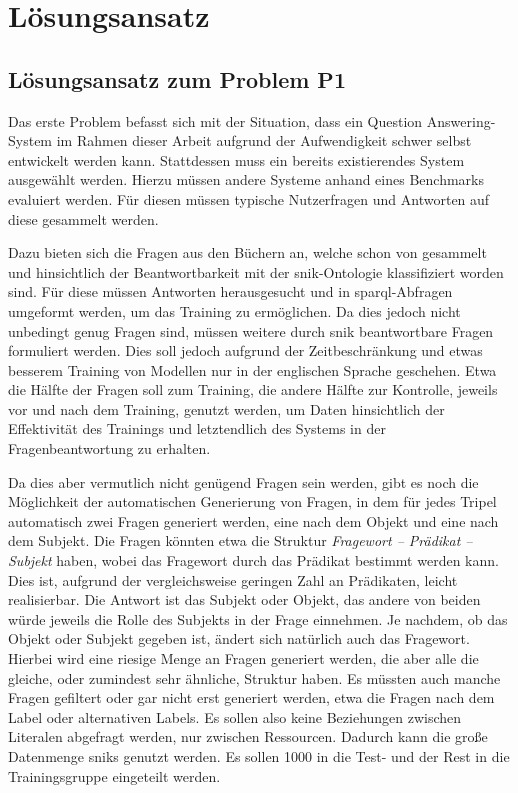 \chapter{Lösungsansatz}\label{ch:approach}

\section{Lösungsansatz zum Problem P1}

Das erste Problem befasst sich mit der Situation, dass ein Question Answering-System im Rahmen dieser Arbeit aufgrund der Aufwendigkeit schwer selbst entwickelt werden kann.
Stattdessen muss ein bereits existierendes System ausgewählt werden.
Hierzu müssen andere Systeme anhand eines Benchmarks evaluiert werden.
Für diesen müssen typische Nutzerfragen und Antworten auf diese gesammelt werden.

Dazu bieten sich die Fragen aus den Büchern an, welche schon von \citet{arneba} gesammelt und hinsichtlich der Beantwortbarkeit mit der \ac{snik}-Ontologie klassifiziert worden sind.
Für diese müssen Antworten herausgesucht und in \ac{sparql}-Abfragen umgeformt werden, um das Training zu ermöglichen.
Da dies jedoch nicht unbedingt genug Fragen sind, müssen weitere durch \ac{snik} beantwortbare Fragen formuliert werden.
Dies soll jedoch aufgrund der Zeitbeschränkung und etwas besserem Training von Modellen nur in der englischen Sprache geschehen.
Etwa die Hälfte der Fragen soll zum Training, die andere Hälfte zur Kontrolle, jeweils vor und nach dem Training, genutzt werden,
um Daten hinsichtlich der Effektivität des Trainings und letztendlich des Systems in der Fragenbeantwortung zu erhalten.

Da dies aber vermutlich nicht genügend Fragen sein werden, gibt es noch die Möglichkeit der automatischen Generierung von Fragen, in dem für jedes Tripel automatisch zwei Fragen generiert werden,
eine nach dem Objekt und eine nach dem Subjekt.
Die Fragen könnten etwa die Struktur \emph{Fragewort -- Prädikat -- Subjekt} haben, wobei das Fragewort durch das Prädikat bestimmt werden kann.
Dies ist, aufgrund der vergleichsweise geringen Zahl an Prädikaten, leicht realisierbar.
Die Antwort ist das Subjekt oder Objekt, das andere von beiden würde jeweils die Rolle des Subjekts in der Frage einnehmen.
Je nachdem, ob das Objekt oder Subjekt gegeben ist, ändert sich natürlich auch das Fragewort.
Hierbei wird eine riesige Menge an Fragen generiert werden, die aber alle die gleiche, oder zumindest sehr ähnliche, Struktur haben.
Es müssten auch manche Fragen gefiltert oder gar nicht erst generiert werden, etwa die Fragen nach dem Label oder alternativen Labels.
Es sollen also keine Beziehungen zwischen Literalen abgefragt werden, nur zwischen Ressourcen.
Dadurch kann die große Datenmenge \ac{snik}s genutzt werden.
Es sollen 1000 in die Test- und der Rest in die Trainingsgruppe eingeteilt werden.


